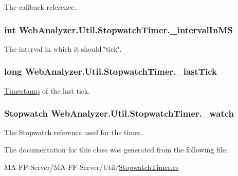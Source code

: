 The callback reference. 

\hypertarget{class_web_analyzer_1_1_util_1_1_stopwatch_timer_a22d6806aa912ee0bfcd6e2071c45caac}{}
\subsubsection[{\+\_\+interval\+In\+M\+S}]{\setlength{\rightskip}{0pt plus 5cm}int Web\+Analyzer.\+Util.\+Stopwatch\+Timer.\+\_\+interval\+In\+M\+S\hspace{0.3cm}{\ttfamily [private]}}\label{class_web_analyzer_1_1_util_1_1_stopwatch_timer_a22d6806aa912ee0bfcd6e2071c45caac}


The interval in which it should \char`\"{}tick\char`\"{}. 

\hypertarget{class_web_analyzer_1_1_util_1_1_stopwatch_timer_a598514e43384c8e3728a6ea751a359d8}{}
\subsubsection[{\+\_\+last\+Tick}]{\setlength{\rightskip}{0pt plus 5cm}long Web\+Analyzer.\+Util.\+Stopwatch\+Timer.\+\_\+last\+Tick\hspace{0.3cm}{\ttfamily [private]}}\label{class_web_analyzer_1_1_util_1_1_stopwatch_timer_a598514e43384c8e3728a6ea751a359d8}


\hyperlink{class_web_analyzer_1_1_util_1_1_timestamp}{Timestamp} of the last tick. 

\hypertarget{class_web_analyzer_1_1_util_1_1_stopwatch_timer_a0e339fc5d72427474cd3eedad231f279}{}
\subsubsection[{\+\_\+watch}]{\setlength{\rightskip}{0pt plus 5cm}Stopwatch Web\+Analyzer.\+Util.\+Stopwatch\+Timer.\+\_\+watch\hspace{0.3cm}{\ttfamily [private]}}\label{class_web_analyzer_1_1_util_1_1_stopwatch_timer_a0e339fc5d72427474cd3eedad231f279}


The Stopwatch reference used for the timer. 



The documentation for this class was generated from the following file\+:\begin{DoxyCompactItemize}
\item 
M\+A-\/\+F\+F-\/\+Server/\+M\+A-\/\+F\+F-\/\+Server/\+Util/\hyperlink{_stopwatch_timer_8cs}{Stopwatch\+Timer.\+cs}\end{DoxyCompactItemize}
